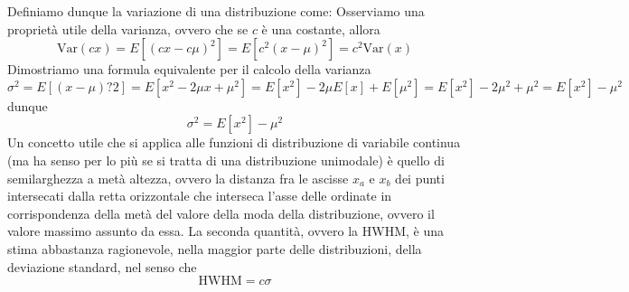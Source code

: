 \documentclass{report}
\begin{document}
Definiamo dunque la variazione di una distribuzione come:
\noindent Osserviamo una proprietà utile della varianza, ovvero che se $c$ è una costante, allora
$$
	\text{Var}(cx) = E[(cx - c\mu)^2] = E[c^2(x - \mu)^2] = c^2 \text{Var}(x) 
$$
Dimostriamo una formula equivalente per il calcolo della varianza
\begin{equation*}
	\sigma^2 = E[(x - \mu)?2] = E[x^2 - 2 \mu x + \mu^2] = E[x^2] - 2 \mu E[x] + E[\mu^2] = E[x^2] - 2 \mu^2 + \mu^2 = E[x^2] - \mu^2
\end{equation*}
dunque
\begin{equation}
	\sigma^2 = E[x^2] - \mu^2
	\label{eq:calcolo_sigma}
\end{equation}
Un concetto utile che si applica alle funzioni di distribuzione di variabile continua (ma ha senso per lo più se si tratta di una distribuzione unimodale) è quello di semilarghezza a metà altezza, ovvero la distanza fra le ascisse $x_a$ e $x_b$ dei punti intersecati dalla retta orizzontale che interseca l'asse delle ordinate in corrispondenza della metà del valore della moda della distribuzione, ovvero il valore massimo assunto da essa. 
\noindent La seconda quantità, ovvero la HWHM, è una stima abbastanza ragionevole, nella maggior parte delle distribuzioni, della deviazione standard, nel senso che
\begin{equation}
	\text{HWHM} = c \sigma
\end{equation}
\end{document}
